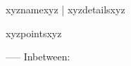 xyznamexyz | xyzdetailsxyz
\begin{itemize}
    xyzpointsxyz
\end{itemize}
-----
Inbetween: \vspace{4pt}
